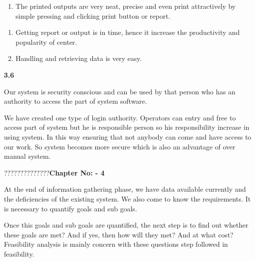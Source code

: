 \documentclass{article} %
\begin{document}
\begin{enumerate}
\item  The printed outputs are very neat, precise and even print attractively by simple pressing and clicking print button or report. 
\end{enumerate}

\noindent 

\begin{enumerate}
\item  Getting report or output is in time, hence it increase the productivity and popularity of center. 

\item  Handling and retrieving data is very easy. 
\end{enumerate}

\noindent 

\noindent \textbf{3.6  }

\noindent Our system is security conscious and can be used by that person who has an authority to access the part of system software. 

\noindent We have created one type of login authority. Operators can entry and free to access part of system but he is responsible person so his responsibility increase in using system. In this way ensuring that not anybody can come and have access to our work. So system becomes more secure which is also an advantage of over manual system.

\noindent 

\noindent 

\noindent 

\noindent 

\noindent 

\noindent ??????????????\textbf{Chapter No: - 4 }

\noindent \textbf{                                   }\underbar{}

\noindent \textbf{}\underbar{}

\noindent          At the end of information gathering phase, we have data available currently and the deficiencies of the existing system. We also come to know the requirements. It is necessary to quantify goals and sub goals. 

\noindent                  Once this goals and sub goals are quantified, the next step is to find out whether these goals are met? And if yes, then how will they met? And at what cost? Feasibility analysis is mainly concern with these questions step followed in feasibility. 
\end{document}
